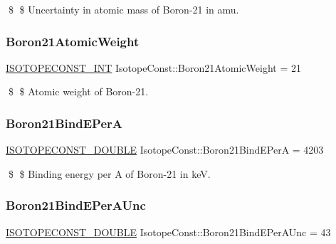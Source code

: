 \$ \$ Uncertainty in atomic mass of Boron-\/21 in amu. \mbox{\label{group___isotope_const-_boron-_b21_ga923d8b7030de536c29de711d1dedc228}} 
\subsubsection{\texorpdfstring{Boron21\+Atomic\+Weight}{Boron21AtomicWeight}}
{\footnotesize\ttfamily \mbox{\hyperlink{group___isotope_const-_macros_ga5f18360b3e99483a35c32d789e62621c}{I\+S\+O\+T\+O\+P\+E\+C\+O\+N\+S\+T\+\_\+\+I\+NT}} Isotope\+Const\+::\+Boron21\+Atomic\+Weight = 21}

\$ \$ Atomic weight of Boron-\/21. \mbox{\label{group___isotope_const-_boron-_b21_gac24a50efe4fc004d78bf8876ba5817ec}} 
\subsubsection{\texorpdfstring{Boron21\+Bind\+E\+PerA}{Boron21BindEPerA}}
{\footnotesize\ttfamily \mbox{\hyperlink{group___isotope_const-_macros_ga8f45a7272ce02c0b4c65c44636ed719a}{I\+S\+O\+T\+O\+P\+E\+C\+O\+N\+S\+T\+\_\+\+D\+O\+U\+B\+LE}} Isotope\+Const\+::\+Boron21\+Bind\+E\+PerA = 4203}

\$ \$ Binding energy per A of Boron-\/21 in keV. \mbox{\label{group___isotope_const-_boron-_b21_gac3bad56e53a10a4472e30358647033c9}} 
\subsubsection{\texorpdfstring{Boron21\+Bind\+E\+Per\+A\+Unc}{Boron21BindEPerAUnc}}
{\footnotesize\ttfamily \mbox{\hyperlink{group___isotope_const-_macros_ga8f45a7272ce02c0b4c65c44636ed719a}{I\+S\+O\+T\+O\+P\+E\+C\+O\+N\+S\+T\+\_\+\+D\+O\+U\+B\+LE}} Isotope\+Const\+::\+Boron21\+Bind\+E\+Per\+A\+Unc = 43}

